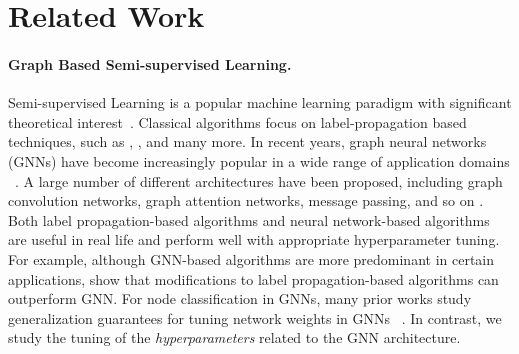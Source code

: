 \section{Related Work}
\paragraph{Graph Based Semi-supervised Learning.} Semi-supervised Learning is a popular machine learning paradigm with significant theoretical interest~\citep{zhou2003learning,delalleau2005efficient,garg2020generaliz}. Classical algorithms focus on label-propagation based techniques, such as \citet{zhou2003learning}, \citet{zhu2003semi}, and many more. 
In recent years, graph neural networks (GNNs) have become increasingly popular in a wide range of application domains
~\citep{kipf2016semi,velivckovic2017graph,iscen2019label}.
A large number of different architectures have been proposed, including graph convolution networks, graph attention networks, message passing, and so on \citep{dwivedi2023benchmarking}. 
Both label propagation-based algorithms and neural network-based algorithms are useful in real life and perform  well with appropriate hyperparameter tuning. For example, although GNN-based algorithms are more predominant in certain applications, \cite{huang2020combininglabelpropagationsimple} show that modifications to label propagation-based algorithms can outperform GNN. For node classification in GNNs, many prior works study generalization guarantees for tuning network weights in GNNs ~\citep{oono2021optimizationgeneralizationanalysistransduction, esser2021learningtheorysometimesexplain, tang2023understandinggeneralizationgraphneural}. In contrast, we study the tuning of the \textit{hyperparameters} related to the GNN architecture. 


